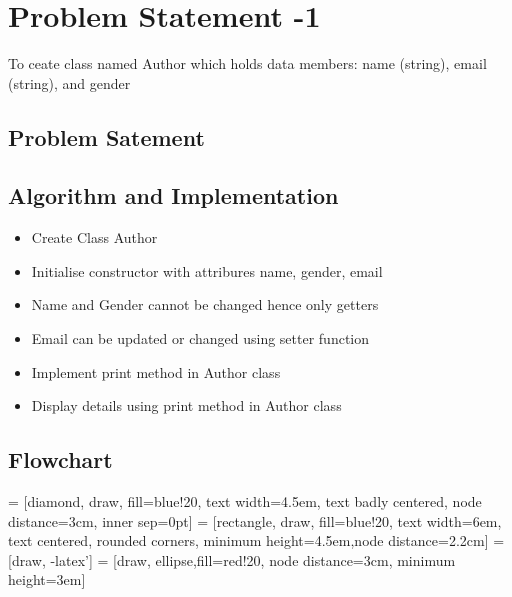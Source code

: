 \documentclass[12pt]{article}
\begin{document}
  \section{Problem Statement -1}
 To ceate class named Author which holds data members: name (string), email (string), and gender 

  \subsection{Problem Satement}
  
  \subsection{Algorithm and Implementation}
  \begin{itemize}
  \item Create Class Author
  \item Initialise constructor with attribures name, gender, email
  \item Name and Gender cannot be changed hence only getters
  \item Email can be updated or changed using setter function
  \item Implement print method in Author class
  \item Display details using print method in Author class
  \end{itemize}
  \subsection{Flowchart}
   = [diamond, draw, fill=blue!20, 
    text width=4.5em, text badly centered, node distance=3cm, inner sep=0pt]
 = [rectangle, draw, fill=blue!20, 
    text width=6em, text centered, rounded corners, minimum height=4.5em,node distance=2.2cm]
 = [draw, -latex']
 = [draw, ellipse,fill=red!20, node distance=3cm,
    minimum height=3em]
  \begin{center}    
\end{center}
\end{document}
